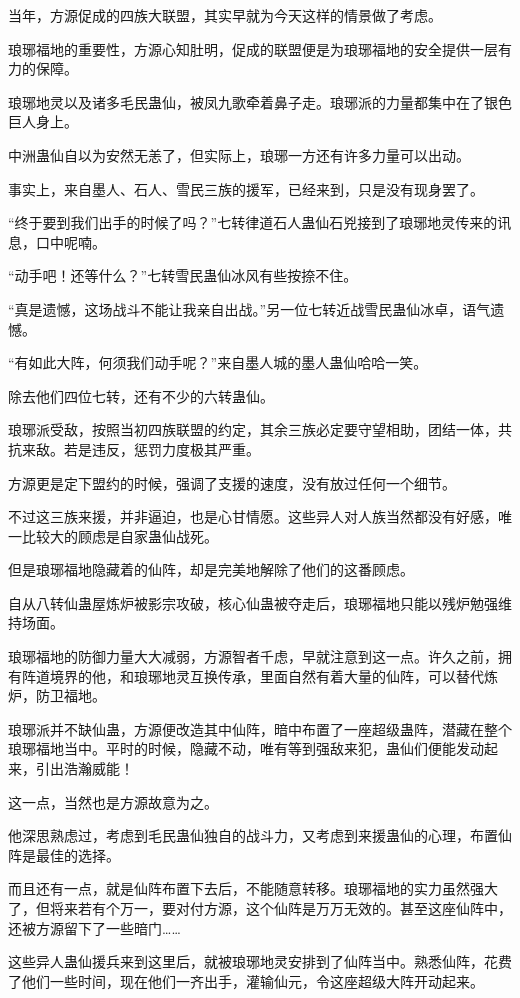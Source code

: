 \begin{this_body}
当年，方源促成的四族大联盟，其实早就为今天这样的情景做了考虑。

琅琊福地的重要性，方源心知肚明，促成的联盟便是为琅琊福地的安全提供一层有力的保障。

琅琊地灵以及诸多毛民蛊仙，被凤九歌牵着鼻子走。琅琊派的力量都集中在了银色巨人身上。

中洲蛊仙自以为安然无恙了，但实际上，琅琊一方还有许多力量可以出动。

事实上，来自墨人、石人、雪民三族的援军，已经来到，只是没有现身罢了。

“终于要到我们出手的时候了吗？”七转律道石人蛊仙石兇接到了琅琊地灵传来的讯息，口中呢喃。

“动手吧！还等什么？”七转雪民蛊仙冰风有些按捺不住。

“真是遗憾，这场战斗不能让我亲自出战。”另一位七转近战雪民蛊仙冰卓，语气遗憾。

“有如此大阵，何须我们动手呢？”来自墨人城的墨人蛊仙哈哈一笑。

除去他们四位七转，还有不少的六转蛊仙。

琅琊派受敌，按照当初四族联盟的约定，其余三族必定要守望相助，团结一体，共抗来敌。若是违反，惩罚力度极其严重。

方源更是定下盟约的时候，强调了支援的速度，没有放过任何一个细节。

不过这三族来援，并非逼迫，也是心甘情愿。这些异人对人族当然都没有好感，唯一比较大的顾虑是自家蛊仙战死。

但是琅琊福地隐藏着的仙阵，却是完美地解除了他们的这番顾虑。

自从八转仙蛊屋炼炉被影宗攻破，核心仙蛊被夺走后，琅琊福地只能以残炉勉强维持场面。

琅琊福地的防御力量大大减弱，方源智者千虑，早就注意到这一点。许久之前，拥有阵道境界的他，和琅琊地灵互换传承，里面自然有着大量的仙阵，可以替代炼炉，防卫福地。

琅琊派并不缺仙蛊，方源便改造其中仙阵，暗中布置了一座超级蛊阵，潜藏在整个琅琊福地当中。平时的时候，隐藏不动，唯有等到强敌来犯，蛊仙们便能发动起来，引出浩瀚威能！

这一点，当然也是方源故意为之。

他深思熟虑过，考虑到毛民蛊仙独自的战斗力，又考虑到来援蛊仙的心理，布置仙阵是最佳的选择。

而且还有一点，就是仙阵布置下去后，不能随意转移。琅琊福地的实力虽然强大了，但将来若有个万一，要对付方源，这个仙阵是万万无效的。甚至这座仙阵中，还被方源留下了一些暗门……

这些异人蛊仙援兵来到这里后，就被琅琊地灵安排到了仙阵当中。熟悉仙阵，花费了他们一些时间，现在他们一齐出手，灌输仙元，令这座超级大阵开动起来。


\end{this_body}
